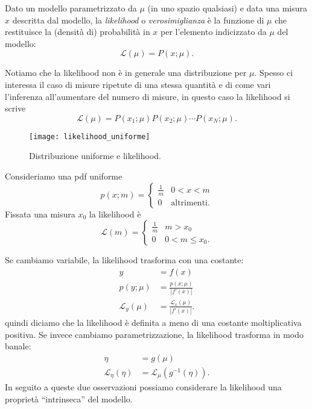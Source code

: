 \begin{definition}[Likelihood]
	Dato un modello parametrizzato da $\mu$ (in uno spazio qualsiasi)
	e data una misura $x$ descritta dal modello,
	la \emph{likelihood} o \emph{verosimiglianza} è la funzione di $\mu$
	che restituisce la (densità di) probabilità in $x$ per l'elemento indicizzato da $\mu$ del modello:
	\begin{equation*}
		\mathcal L(\mu) = P(x;\mu).
	\end{equation*}
\end{definition}

Notiamo che la likelihood non è in generale una distribuzione per $\mu$.
Spesso ci interessa il caso di misure ripetute di una stessa quantità e di come vari l'inferenza all'aumentare del numero di misure, in questo caso la likelihood si scrive
\begin{equation*}
	\mathcal L(\mu) = P(x_1;\mu) P(x_2;\mu) \dotsm P(x_N;\mu).
\end{equation*}

\begin{example}
	\begin{figure}
		\centering
		\texttt{[image: likelihood\_uniforme]}
		\caption{Distribuzione uniforme e likelihood.}
	\end{figure}
	Consideriamo una pdf uniforme
	\begin{equation*}
		p(x;m) = \begin{cases}
			\frac 1m & 0<x<m \\
			0 & \text{altrimenti.}
		\end{cases}
	\end{equation*}
	Fissata una misura $x_0$ la likelihood è
	\begin{equation*}
		\mathcal L(m) = \begin{cases}
			\frac 1m & m > x_0 \\
			0 & 0 < m \le x_0.
		\end{cases}
	\end{equation*}
\end{example}

Se cambiamo variabile, la likelihood trasforma con una costante:
\begin{align*}
	y &= f(x) \\
	p(y;\mu) &= \frac{p(x;\mu)}{|f'(x)|} \\
	\mathcal L_y(\mu) &= \frac{\mathcal L_x(\mu)}{|f'(x)|}.
\end{align*}
quindi diciamo che la likelihood è definita a meno di una costante moltiplicativa positiva.
Se invece cambiamo parametrizzazione, la likelihood trasforma in modo banale:
\begin{align*}
	\eta &= g(\mu) \\
	\mathcal L_\eta(\eta) &= \mathcal L_\mu(g^{-1}(\eta)).
\end{align*}
In seguito a queste due osservazioni possiamo considerare la likelihood una proprietà ``intrinseca'' del modello.

